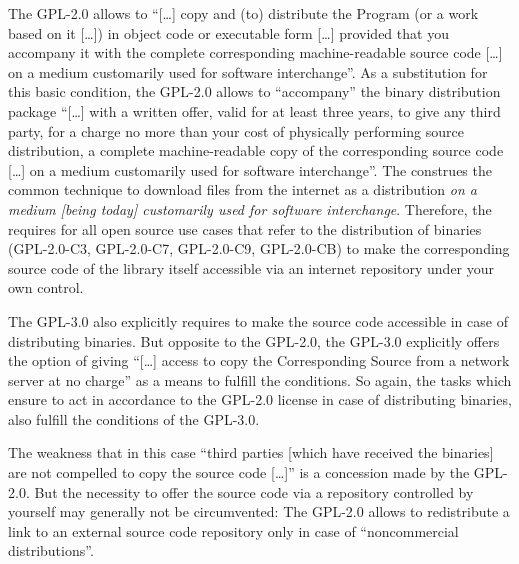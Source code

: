 The GPL-2.0 allows to \enquote{[\ldots] copy and (to) distribute the Program (or
a work based on it [\ldots]) in object code or executable form [\ldots] provided
that you accompany it with the complete corresponding machine-readable source
code [\ldots] on a medium customarily used for software
interchange}. As a substitution for this basic condition,
the GPL-2.0 allows to \enquote{accompany} the binary distribution package
\enquote{[\ldots] with a written offer, valid for at least three years, to give
any third party, for a charge no more than your cost of physically performing
source distribution, a complete machine-readable copy of the corresponding
source code [\ldots] on a medium customarily used for software
interchange}. The \oslic{} construes the common technique to
download files from the internet as a distribution \emph{on a medium [being
today] customarily used for software interchange}. Therefore, the \oslic{} requires
for all open source use cases that refer to the distribution of binaries
(GPL-2.0-C3, GPL-2.0-C7, GPL-2.0-C9, GPL-2.0-CB) to make the corresponding
source code of the library itself accessible via an internet repository under
your own control. 
  
\label{Gpl3CondCopyleft}
The GPL-3.0 also explicitly requires to make the source code accessible in case
of distributing binaries. But opposite to the GPL-2.0, the GPL-3.0 explicitly
offers the option of giving \enquote{[\ldots] access to copy the Corresponding
Source from a network server at no charge} as a means to fulfill the
conditions. So again, the tasks which ensure to act in
accordance to the GPL-2.0 license in case of distributing binaries, also fulfill
the conditions of the GPL-3.0.

The weakness that in this case \enquote{third parties [which have received the
binaries] are not compelled to copy the source code [\ldots]} is a concession
made by the GPL-2.0. But the necessity to offer the
source code via a repository controlled by yourself may generally not be
circumvented: The GPL-2.0 allows to redistribute a link to an external source
code repository only in case of \enquote{noncommercial
distributions}. 
  
